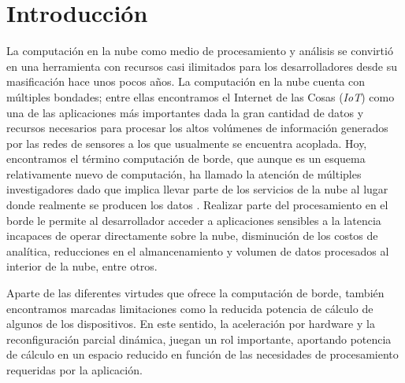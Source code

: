 
\chapter{Introducción} %
\label{Chapter1}

La computación en la nube como medio de procesamiento y análisis se convirtió en una herramienta con recursos casi ilimitados para los desarrolladores desde su masificación hace unos pocos años. La computación en la nube cuenta con múltiples bondades; entre ellas encontramos el Internet de las Cosas (\textit{IoT}) como una de las aplicaciones más importantes dada la gran cantidad de datos y recursos necesarios para procesar los altos volúmenes de información generados por las redes de sensores a los que usualmente se encuentra acoplada. Hoy, encontramos el término computación de borde, que aunque es un esquema relativamente nuevo de computación, ha llamado la atención de múltiples investigadores dado que implica llevar parte de los servicios de la nube al lugar donde realmente se producen los datos \cite{bonomi2014fog}. Realizar parte del procesamiento en el borde le permite al desarrollador acceder a aplicaciones sensibles a la latencia incapaces de operar directamente sobre la nube, disminución de los costos de analítica, reducciones en el almancenamiento y volumen de datos procesados al interior de la nube, entre otros.


Aparte de las diferentes virtudes que ofrece la computación de borde, también encontramos marcadas limitaciones como la reducida potencia de cálculo de algunos de los dispositivos. En este sentido, la aceleración por hardware y la reconfiguración parcial dinámica, juegan un rol importante, aportando potencia de cálculo en un espacio reducido en función de las necesidades de procesamiento requeridas por la aplicación.

